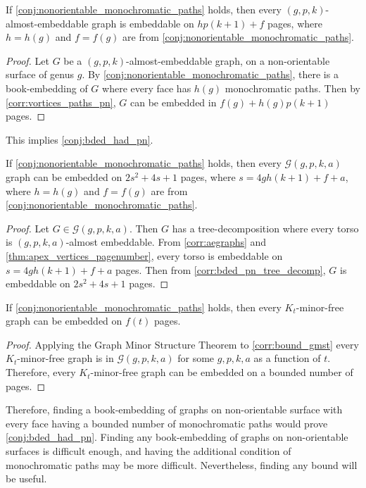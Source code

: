 \begin{corollary}\label{corr:aegraphs}
	If \cref{conj:nonorientable_monochromatic_paths} holds, then every $(g, p, k)$-almost-embeddable graph is embeddable on $h p (k + 1) + f$ pages, where $h = h(g)$ and $f = f(g)$ are from \cref{conj:nonorientable_monochromatic_paths}.
\end{corollary}

\begin{proof}
	Let $G$ be a $(g, p, k)$-almost-embeddable graph, on a non-orientable surface of genus $g$. By \cref{conj:nonorientable_monochromatic_paths}, there is a book-embedding of $G$ where every face has $h(g)$ monochromatic paths. Then by \cref{corr:vortices_paths_pn}, $G$ can be embedded in $f(g) + h(g) p (k+1)$ pages. 
\end{proof}

This implies \cref{conj:bded_had_pn}.
\begin{corollary}\label{corr:bound_gmst}
	If \cref{conj:nonorientable_monochromatic_paths} holds, then every $\mathcal{G}(g, p, k, a)$ graph can be embedded on $2s^2 + 4s + 1$ pages, where $s =  4g h (k + 1) + f + a$, where $h = h(g)$ and $f = f(g)$ are from \cref{conj:nonorientable_monochromatic_paths}. 
\end{corollary}

\begin{proof}
	Let $G \in \mathcal{G}(g, p, k, a)$. Then $G$ has a tree-decomposition where every torso is $(g, p, k, a)$-almost embeddable. From \cref{corr:aegraphs} and \cref{thm:apex_vertices_pagenumber}, every torso is embeddable on $s = 4g h (k + 1) + f + a$ pages. Then from \cref{corr:bded_pn_tree_decomp}, $G$ is embeddable on $2s^2 + 4s + 1$ pages.
\end{proof}

\begin{corollary}
	If \cref{conj:nonorientable_monochromatic_paths} holds, then every $K_t$-minor-free graph can be embedded on $f(t)$ pages. 
\end{corollary}

\begin{proof}
	Applying the Graph Minor Structure Theorem to \cref{corr:bound_gmst} every $K_t$-minor-free graph is in $\mathcal{G}(g, p, k, a)$ for some $g, p, k, a$ as a function of $t$. Therefore, every $K_t$-minor-free graph can be embedded on a bounded number of pages. 
\end{proof}

Therefore, finding a book-embedding of graphs on non-orientable surface with every face having a bounded number of monochromatic paths would prove \cref{conj:bded_had_pn}. Finding any book-embedding of graphs on non-orientable surfaces is difficult enough, and having the additional condition of monochromatic paths may be more difficult. Nevertheless, finding any bound will be useful.